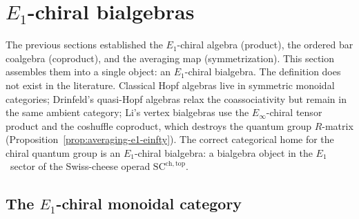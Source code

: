 \section{\texorpdfstring{$E_1$}{E-1}-chiral bialgebras}
\label{sec:e1-chiral-bialgebras}

The previous sections established the $E_1$-chiral algebra (product),
the ordered bar coalgebra (coproduct), and the averaging map
(symmetrization). This section assembles them into a single object: an
$E_1$-chiral bialgebra. The definition does not exist in the literature.
Classical Hopf algebras live in symmetric monoidal categories;
Drinfeld's quasi-Hopf algebras relax the coassociativity but remain
in the same ambient category; Li's vertex bialgebras use
the $E_\infty$-chiral tensor product and the coshuffle coproduct, which
destroys the quantum group $R$-matrix (Proposition~\ref{prop:averaging-e1-einfty}).
The correct categorical home for the chiral quantum group is an
$E_1$-chiral bialgebra: a bialgebra object in the $E_1$~sector of the
Swiss-cheese operad $\mathrm{SC}^{\mathrm{ch},\mathrm{top}}$.

\subsection{The \texorpdfstring{$E_1$}{E-1}-chiral monoidal category}
\label{subsec:e1-chiral-monoidal}

